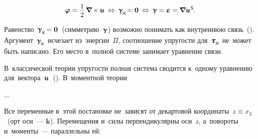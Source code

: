 \begin{otherlanguage}{russian}
\nopagebreak\vspace{-0.1em}\begin{equation}
\fieldofrotations = \displaystyle \onehalf \hspace{0.4ex} \boldnabla \hspace{-0.16ex} \times \hspace{-0.1ex} \fieldofdisplacements 
\:\Leftrightarrow\:
\distortiontensor_{\hspace{-0.25ex}\Xcompanion} \hspace{-0.32ex} = \bm{0}
\:\Leftrightarrow\:
\distortiontensor = \mathboldepsilon = \hspace{-0.12ex} \boldnabla {\fieldofdisplacements}^{\hspace{0.1ex}\mathsf{S}} \hspace{-0.25ex}.
\end{equation}

Равенство~${\distortiontensor_{\hspace{-0.25ex}\Xcompanion} \hspace{-0.32ex} = \bm{0}}$~(симметрию~$\bm{\upgamma}$) возможно понимать как внутреннюю связь~(). Аргумент~${\distortiontensor_{\hspace{-0.25ex}\Xcompanion}}$ исчезает из~энергии~$\Pi$, соотношение упругости для~${\forcestresstensor_{\hspace{-0.1ex}\Xcompanion}}$ не~может быть написано. Его место в~полной системе занимает уравнение связи.

В~классической теории упругости полная система сводится к~одному уравнению для~вектора~$\bm{u}$~(). В~моментной теории

...





\label{para:planedeformation.cosseratcontinuum}

Все переменные в~этой постановке не~зависят от декартовой координаты~${z \equiv x_3}$~(орт оси~--- $\bm{k}$). Перемещения и~силы перпендикулярны оси~$z$, а~повороты и~моменты~--- параллельны ей:


\end{otherlanguage}
